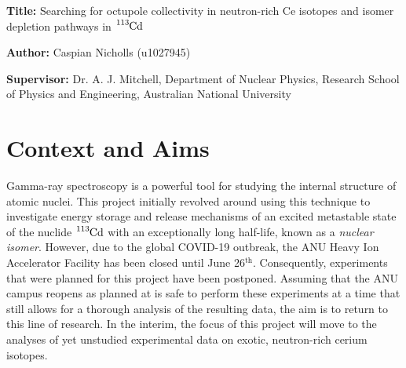 \documentclass[12pt,a4paper]{article}
\begin{document}

\noindent
\textbf{Title: }Searching for octupole collectivity in neutron-rich Ce isotopes and isomer depletion pathways in $\ce{^{113}Cd}$

\noindent
\textbf{Author: } Caspian Nicholls (u1027945)

\noindent
\textbf{Supervisor: } Dr. A. J. Mitchell, Department of Nuclear Physics, Research School of Physics and Engineering, Australian National University

%
%

\section*{Context and Aims}

Gamma-ray spectroscopy is a powerful tool for studying the internal structure of atomic nuclei.
This project initially revolved around using this technique to investigate energy storage and release mechanisms of an excited metastable state of the nuclide $\ce{^{113}Cd}$ with an exceptionally long half-life, known as a \textit{nuclear isomer}.
However, due to the global COVID-19 outbreak, the ANU Heavy Ion Accelerator Facility has been closed until June 26$^\text{th}$. Consequently, experiments that were planned for this project have been postponed.
Assuming that the ANU campus reopens as planned at is safe to perform these experiments at a time that still allows for a thorough analysis of the resulting data, the aim is to return to this line of research.
In the interim, the focus of this project will move to the analyses of yet unstudied experimental data on exotic, neutron-rich cerium isotopes.
\end{document}
